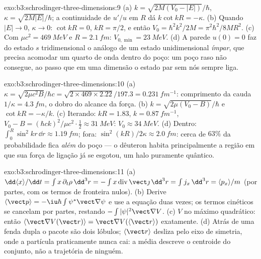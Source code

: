 \begin{solution}{exo:b3:schrodinger-three-dimensions:9}
(a) $k = \sqrt{2M(V_0 - |E|)}/\hbar$, $\kappa = \sqrt{2M|E|}/\hbar$;
a continuidade de $u'/u$ em $R$ dá $k\cot kR = -\kappa$. (b) Quando $|E|
\to 0$, $\kappa \to 0$: $\cot kR = 0$, $kR = \pi/2$, e então $V_0 =
\hbar^2k^2/2M = \pi^2\hbar^2/8MR^2$. (c) Com $\mu c^2 =
\qty{469}{MeV}$ e $R = \qty{2.1}{fm}$: $V_{0,\min} = \qty{23}{MeV}$.
(d) A parede $u(0) = 0$ faz do estado $s$ tridimensional o análogo de
um estado unidimensional \emph{ímpar}, que precisa acomodar um quarto
de onda dentro do poço: um poço raso não consegue, ao passo que em uma
dimensão o estado par sem nós sempre liga.
\end{solution}

\begin{solution}{exo:b3:schrodinger-three-dimensions:10}
(a) $\kappa = \sqrt{2\mu c^2B}/\hbar c = \sqrt{2 \times 469 \times
2.22}/197.3 = \qty{0.231}{fm^{-1}}$: comprimento da cauda $1/\kappa =
\qty{4.3}{fm}$, o dobro do alcance da força. (b) $k =
\sqrt{2\mu(V_0 - B)}/\hbar$ e $\cot kR = -\kappa/k$. (c) Iterando:
$kR = 1.83$, $k = \qty{0.87}{fm^{-1}}$, $V_0 - B = (\hbar ck)^2/\mu
c^2\cdot\tfrac12 \approx \qty{31}{MeV}$: $V_0 \approx \qty{34}{MeV}$.
(d) Dentro: $\int_0^R\sin^2kr\,\dd r \approx \qty{1.19}{fm}$; fora:
$\sin^2(kR)/2\kappa \approx \qty{2.0}{fm}$: cerca de $63\%$ da
probabilidade fica \emph{além} do poço --- o dêuteron habita
principalmente a região em que sua força de ligação já se esgotou, um
halo puramente quântico.
\end{solution}

\begin{solution}{exo:b3:schrodinger-three-dimensions:11}
(a) $\dd\langle x\rangle/\dd t = \int x\,\partial_t\rho\,\dd^3r =
-\int x\operatorname{div}\vect\jmath\,\dd^3r = \int j_x\,\dd^3r =
\langle p_x\rangle/m$ (por partes, com os termos de fronteira nulos).
(b) Derive $\langle\vect p\rangle = -\iu\hbar\int\psi^*\vect\nabla
\psi$ e use a equação duas vezes; os termos cinéticos se cancelam por
partes, restando $-\int|\psi|^2\vect\nabla V$. (c) $V$ no máximo
quadrático: então $\langle\vect\nabla V(\vect r)\rangle = \vect\nabla V(\langle
\vect r\rangle)$ exatamente. (d) Atrás de uma fenda dupla o pacote são
dois lóbulos; $\langle\vect r\rangle$ desliza pelo eixo de simetria,
onde a partícula praticamente nunca cai: a média descreve o centroide
do conjunto, não a trajetória de ninguém.
\end{solution}

